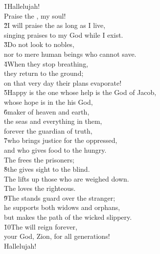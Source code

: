 \begin{poetry}
\poeml \v{1}Hallelujah! \\
\poemll    Praise the , my soul! \\
\poeml \v{2}I will praise the  as long as I live, \\
\poemll    singing praises to my God while I exist. \\
\poeml \v{3}Do not look to nobles, \\
\poemll    nor to mere human beings who cannot save. \\
\poeml \v{4}When they stop breathing, \\
\poemll    they return to the ground; \\
\poemlll       on that very day their plans evaporate! \\
\poeml \v{5}Happy is the one whose help is the God of Jacob, \\
\poemll    whose hope is in the  his God, \\
\poeml \v{6}maker of heaven and earth, \\
\poemll    the seas and everything in them, \\
\poemlll       forever the guardian of truth, \\
\poeml \v{7}who brings justice for the oppressed, \\
\poemll    and who gives food to the hungry. \\
\poeml The  frees the prisoners; \\
\poeml \v{8}the  gives sight to the blind. \\
\poeml The  lifts up those who are weighed down. \\
\poemll    The  loves the righteous. \\
\poeml \v{9}The  stands guard over the stranger; \\
\poemll    he supports both widows and orphans, \\
\poemlll       but makes the path of the wicked slippery. \\
\poeml \v{10}The  will reign forever, \\
\poemll    your God, Zion, for all generations! \\
\poeml Hallelujah!
\end{poetry}

